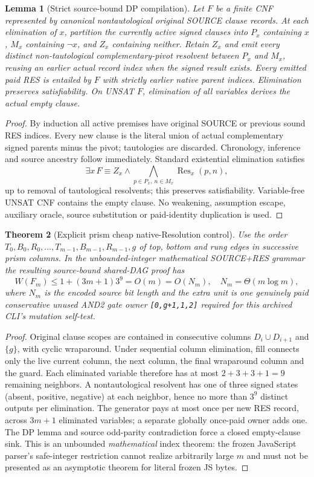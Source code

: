 \documentclass[11pt]{article}
\newtheorem{theorem}{Theorem}
\newtheorem{lemma}[theorem]{Lemma}
\begin{document}
\begin{lemma}[Strict source-bound DP compilation]
Let $F$ be a finite CNF represented by canonical nontautological original SOURCE clause records. At each elimination of $x$, partition the currently active signed clauses into $P_x$ containing $x$, $M_x$ containing $\neg x$, and $Z_x$ containing neither. Retain $Z_x$ and emit every distinct non-tautological complementary-pivot resolvent between $P_x$ and $M_x$, reusing an earlier actual record index when the signed result exists. Every emitted paid RES is entailed by $F$ with strictly earlier native parent indices. Elimination preserves satisfiability. On UNSAT $F$, elimination of all variables derives the actual empty clause.
\end{lemma}
\begin{proof}
By induction all active premises have original SOURCE or previous sound RES indices. Every new clause is the literal union of actual complementary signed parents minus the pivot; tautologies are discarded. Chronology, inference and source ancestry follow immediately. Standard existential elimination satisfies
\[
 \exists x\,F\equiv Z_x\wedge\bigwedge_{p\in P_x,\ n\in M_x}\operatorname{Res}_x(p,n),
\]
up to removal of tautological resolvents; this preserves satisfiability. Variable-free UNSAT CNF contains the empty clause. No weakening, assumption escape, auxiliary oracle, source substitution or paid-identity duplication is used.
\end{proof}

\begin{theorem}[Explicit prism cheap native-Resolution control]
Use the order $T_0,B_0,R_0,\ldots,T_{m-1},B_{m-1},R_{m-1},g$ of top, bottom and rung edges in successive prism columns. In the unbounded-integer mathematical SOURCE+RES grammar the resulting source-bound shared-DAG proof has
\[
 \boxed{W(F_m)\le1+(3m+1)3^9=O(m)=O(N_m),\quad N_m=\Theta(m\log m),}
\]
where $N_m$ is the encoded source bit length and the extra unit is one genuinely paid conservative unused AND2 gate owner \texttt{[0,g+1,1,2]} required for this archived CLI's mutation self-test.
\end{theorem}
\begin{proof}
Original clause scopes are contained in consecutive columns $D_i\cup D_{i+1}$ and $\{g\}$, with cyclic wraparound. Under sequential column elimination, fill connects only the live current column, the next column, the final wraparound column and the guard. Each eliminated variable therefore has at most $2+3+3+1=9$ remaining neighbors. A nontautological resolvent has one of three signed states (absent, positive, negative) at each neighbor, hence no more than $3^9$ distinct outputs per elimination. The generator pays at most once per new RES record, across $3m+1$ eliminated variables; a separate globally once-paid owner adds one. The DP lemma and source odd-parity contradiction force a closed empty-clause sink. This is an unbounded \emph{mathematical} index theorem: the frozen JavaScript parser's safe-integer restriction cannot realize arbitrarily large $m$ and must not be presented as an asymptotic theorem for literal frozen JS bytes.
\end{proof}
\end{document}
